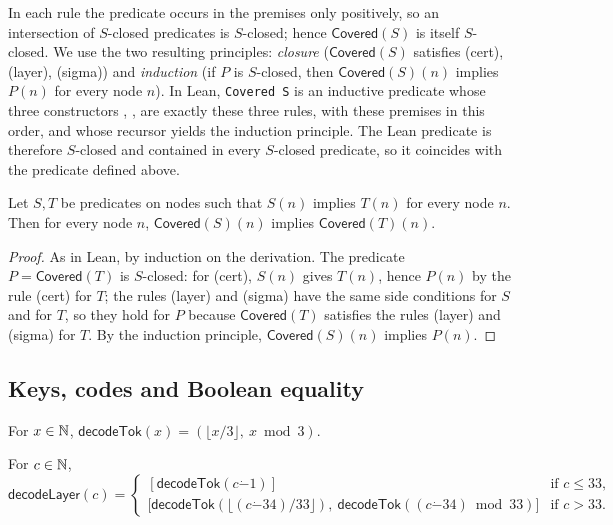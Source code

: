 In each rule the predicate occurs in the premises only positively, so an intersection of $S$-closed predicates is
$S$-closed; hence $\mathsf{Covered}(S)$ is itself $S$-closed. We use the two resulting principles:
\emph{closure} ($\mathsf{Covered}(S)$ satisfies (cert), (layer), (sigma)) and \emph{induction} (if $P$ is $S$-closed,
then $\mathsf{Covered}(S)(n)$ implies $P(n)$ for every node $n$). In Lean, \texttt{Covered S} is an inductive predicate
whose three constructors , ,  are exactly these three rules,
with these premises in this order, and whose recursor yields the induction principle. The Lean predicate is therefore
$S$-closed and contained in every $S$-closed predicate, so it coincides with the predicate defined above.

\begin{lemma}\label{cb:lem:mono}
Let $S,T$ be predicates on nodes such that $S(n)$ implies $T(n)$ for every node $n$. Then for every node $n$,
$\mathsf{Covered}(S)(n)$ implies $\mathsf{Covered}(T)(n)$.
\end{lemma}

\begin{proof}
As in Lean, by induction on the derivation. The predicate $P=\mathsf{Covered}(T)$ is $S$-closed: for (cert), $S(n)$
gives $T(n)$, hence $P(n)$ by the rule (cert) for $T$; the rules (layer) and (sigma) have the same side conditions for
$S$ and for $T$, so they hold for $P$ because $\mathsf{Covered}(T)$ satisfies the rules (layer) and (sigma) for $T$. By
the induction principle, $\mathsf{Covered}(S)(n)$ implies $P(n)$.
\end{proof}

\subsection{Keys, codes and Boolean equality}\label{cb:sec:keys}

\begin{definition}\label{cb:def:decodetok}
For $x\in\mathbb N$, $\mathsf{decodeTok}(x)=(\lfloor x/3\rfloor,\ x\bmod3)$.
\end{definition}

\begin{definition}\label{cb:def:decodelayer}
For $c\in\mathbb N$,
\[
\mathsf{decodeLayer}(c)=\begin{cases}[\mathsf{decodeTok}(c\mathbin{\dot-}1)]&\text{if }c\le33,\\
\big[\mathsf{decodeTok}(\lfloor(c\mathbin{\dot-}34)/33\rfloor),\ \mathsf{decodeTok}((c\mathbin{\dot-}34)\bmod33)\big]
&\text{if }c>33.\end{cases}
\]
\end{definition}

